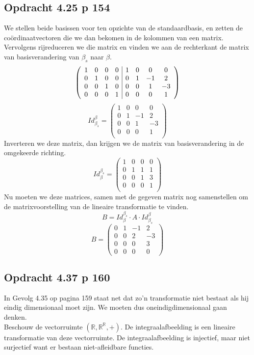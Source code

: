 \documentclass[lineaire_algebra_oplossingen.tex]{subfiles}
\begin{document}
\subsection{Opdracht 4.25 p 154} %
\label{4.25}
We stellen beide basissen voor ten opzichte van de standaardbasis, en zetten de co\"ordinaatvectoren die we dan bekomen in de kolommen van een matrix.
Vervolgens rijreduceren we die matrix en vinden we aan de rechterkant de matrix van basisverandering van $\beta_s$ naar $\beta$.
\[
\left(
\begin{array}{c c c c | c c c c}
1 & 0 & 0 & 0 & 1 & 0 & 0 & 0\\
0 & 1 & 0 & 0 & 0 & 1 & -1 & 2\\
0 & 0 & 1 & 0 & 0 & 0 & 1 & -3\\
0 & 0 & 0 & 1 & 0 & 0 & 0 & 1\\
\end{array}
\right)
\]
\[
Id_{\beta_s}^\beta = 
\begin{pmatrix}
1 & 0 & 0 & 0\\
0 & 1 & -1 & 2\\
0 & 0 & 1 & -3\\
0 & 0 & 0 & 1\\
\end{pmatrix}
\]
Inverteren we deze matrix, dan krijgen we de matrix van basisverandering in de omgekeerde richting.
\[
Id_{\beta}^{\beta_s} = 
\begin{pmatrix}
1 & 0 & 0 & 0\\
0 & 1 & 1 & 1\\
0 & 0 & 1 & 3\\
0 & 0 & 0 & 1\\
\end{pmatrix}
\]
Nu moeten we deze matrices, samen met de gegeven matrix nog samenstellen om de matrixvoorstelling van de lineaire transformatie te vinden.
\[
B = Id_{\beta}^{\beta_s}\cdot  A\cdot Id_{\beta_s}^\beta
\]
\[
B = 
\begin{pmatrix}
0 & 1 & -1 &2\\
0 & 0 & 2 &-3\\
0 & 0 & 0 & 3\\
0 & 0 & 0 & 0
\end{pmatrix}
\]

\subsection{Opdracht 4.37 p 160}
\label{4.37}
In Gevolg 4.35 op pagina 159 staat net dat zo'n transformatie niet bestaat als hij eindig dimensionaal moet zijn. We moeten dus oneindigdimensionaal gaan denken.\\
Beschouw de vectorruimte $(\mathbb{R},\mathbb{R}^\mathbb{R},+)$. De integraalafbeelding is een lineaire transformatie van deze vectorruimte. De integraalafbeelding is injectief, maar niet surjectief want er bestaan niet-afleidbare functies.
\end{document}

